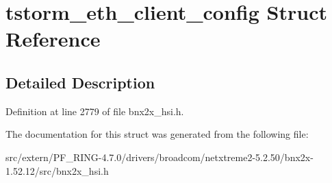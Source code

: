 \hypertarget{structtstorm__eth__client__config}{
\section{tstorm\_\-eth\_\-client\_\-config Struct Reference}
\label{structtstorm__eth__client__config}
}


\subsection{Detailed Description}


Definition at line 2779 of file bnx2x\_\-hsi.h.



The documentation for this struct was generated from the following file:\begin{DoxyCompactItemize}
\item 
src/extern/PF\_\-RING-\/4.7.0/drivers/broadcom/netxtreme2-\/5.2.50/bnx2x-\/1.52.12/src/bnx2x\_\-hsi.h\end{DoxyCompactItemize}
